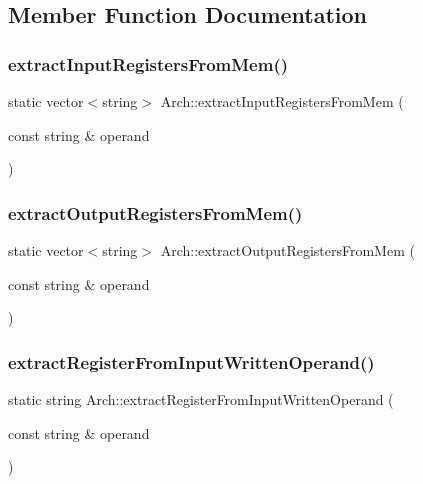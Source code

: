 \subsection{Member Function Documentation}
\mbox{\label{classArch_ad43d2ee62f26a9fa2e193fa3a6cc8935}} 
\subsubsection{\texorpdfstring{extract\+Input\+Registers\+From\+Mem()}{extractInputRegistersFromMem()}}
{\footnotesize\ttfamily static vector$<$string$>$ Arch\+::extract\+Input\+Registers\+From\+Mem (\begin{DoxyParamCaption}\item[{const string \&}]{operand }\end{DoxyParamCaption})\hspace{0.3cm}{\ttfamily [static]}}

\mbox{\label{classArch_a620da5dee3720e53e49e97ce6d7b3e0f}} 
\subsubsection{\texorpdfstring{extract\+Output\+Registers\+From\+Mem()}{extractOutputRegistersFromMem()}}
{\footnotesize\ttfamily static vector$<$string$>$ Arch\+::extract\+Output\+Registers\+From\+Mem (\begin{DoxyParamCaption}\item[{const string \&}]{operand }\end{DoxyParamCaption})\hspace{0.3cm}{\ttfamily [static]}}

\mbox{\label{classArch_aff836e851e244ec98b8223f90a9b5742}} 
\subsubsection{\texorpdfstring{extract\+Register\+From\+Input\+Written\+Operand()}{extractRegisterFromInputWrittenOperand()}}
{\footnotesize\ttfamily static string Arch\+::extract\+Register\+From\+Input\+Written\+Operand (\begin{DoxyParamCaption}\item[{const string \&}]{operand }\end{DoxyParamCaption})\hspace{0.3cm}{\ttfamily [static]}}

